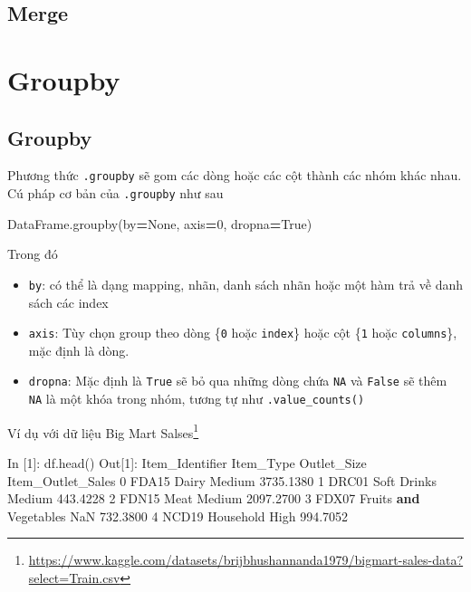\documentclass[
]{book}
\newenvironment{Shaded}{\begin{snugshade}}{\end{snugshade}}
\newcommand{\DecValTok}[1]{\textcolor[rgb]{0.00,0.00,0.81}{#1}}
\newcommand{\FloatTok}[1]{\textcolor[rgb]{0.00,0.00,0.81}{#1}}
\newcommand{\KeywordTok}[1]{\textcolor[rgb]{0.13,0.29,0.53}{\textbf{#1}}}
\newcommand{\NormalTok}[1]{#1}
\newcommand{\OperatorTok}[1]{\textcolor[rgb]{0.81,0.36,0.00}{\textbf{#1}}}
\newcommand{\VariableTok}[1]{\textcolor[rgb]{0.00,0.00,0.00}{#1}}
\renewcommand{\href}[2]{#2\footnote{\url{#1}}}
\begin{document}
\section{Merge}\label{merge}

\chapter{Groupby}\label{groupby}

\section{Groupby}\label{groupby-1}

Phương thức \texttt{.groupby} sẽ gom các dòng hoặc các cột thành các nhóm khác nhau. Cú pháp cơ bản của \texttt{.groupby} như sau

\begin{Shaded}
\begin{Highlighting}[]
\NormalTok{DataFrame.groupby(by}\OperatorTok{=}\VariableTok{None}\NormalTok{, axis}\OperatorTok{=}\DecValTok{0}\NormalTok{, dropna}\OperatorTok{=}\VariableTok{True}\NormalTok{)}
\end{Highlighting}
\end{Shaded}

Trong đó

\begin{itemize}
\item
  \texttt{by}: có thể là dạng mapping, nhãn, danh sách nhãn hoặc một hàm trả về danh sách các index
\item
  \texttt{axis}: Tùy chọn group theo dòng \{\texttt{0} hoặc \texttt{index}\} hoặc cột \{\texttt{1} hoặc \texttt{columns}\}, mặc định là dòng.
\item
  \texttt{dropna}: Mặc định là \texttt{True} sẽ bỏ qua những dòng chứa \texttt{NA} và \texttt{False} sẽ thêm \texttt{NA} là một khóa trong nhóm, tương tự như \texttt{.value\_counts()}
\end{itemize}

Ví dụ với dữ liệu \href{https://www.kaggle.com/datasets/brijbhushannanda1979/bigmart-sales-data?select=Train.csv}{Big Mart Salses}

\begin{Shaded}
\begin{Highlighting}[]
\NormalTok{In [}\DecValTok{1}\NormalTok{]: df.head()}
\NormalTok{Out[}\DecValTok{1}\NormalTok{]:}
\NormalTok{  Item\_Identifier              Item\_Type Outlet\_Size  Item\_Outlet\_Sales}
\DecValTok{0}\NormalTok{           FDA15                  Dairy      Medium          }\FloatTok{3735.1380}
\DecValTok{1}\NormalTok{           DRC01            Soft Drinks      Medium           }\FloatTok{443.4228}
\DecValTok{2}\NormalTok{           FDN15                   Meat      Medium          }\FloatTok{2097.2700}
\DecValTok{3}\NormalTok{           FDX07  Fruits }\KeywordTok{and}\NormalTok{ Vegetables         NaN           }\FloatTok{732.3800}
\DecValTok{4}\NormalTok{           NCD19              Household        High           }\FloatTok{994.7052}
\end{Highlighting}
\end{Shaded}
\end{document}
